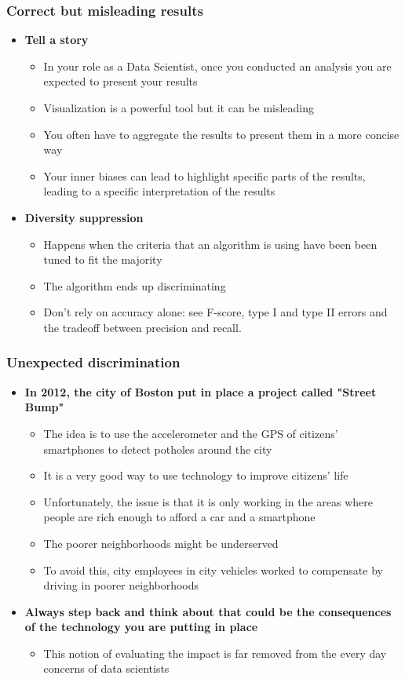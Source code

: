 \documentclass{beamer}
\begin{document}
\begin{frame}\frametitle{Correct but misleading results}
\begin{itemize}
	\setlength\itemsep{1em}
	\item {\bf Tell a story}
	\begin{itemize}
		\item In your role as a Data Scientist, once you conducted an analysis you are expected to present your results
		\item Visualization is a powerful tool but it can be misleading
		\item You often have to aggregate the results to present them in a more concise way
		\item Your inner biases can lead to highlight specific parts of the results, leading to a specific interpretation of the results
	\end{itemize}
	\item {\bf Diversity suppression}
	\begin{itemize}
		\item Happens when the criteria that an algorithm is using have been been tuned to fit the majority
		\item The algorithm ends up discriminating
		\item Don't rely on accuracy alone: see F-score, type I and type II errors and the tradeoff between precision and recall.
	\end{itemize}
\end{itemize}
\end{frame}

\begin{frame}\frametitle{Unexpected discrimination}
\begin{itemize}
	\setlength\itemsep{1em}
	\item {\bf In 2012, the city of Boston put in place a project called "Street Bump"}
	\begin{itemize}
		\item The idea is to use the accelerometer and the GPS of citizens' smartphones to detect potholes around the city
		\item It is a very good way to use technology to improve citizens' life
		\item Unfortunately, the issue is that it is only working in the areas where people are rich enough to afford a car and a smartphone
		\item The poorer neighborhoods might be underserved
		\item To avoid this, city employees in city vehicles worked to compensate by driving in poorer neighborhoods
	\end{itemize}
	\item {\bf Always step back and think about that could be the consequences of the technology you are putting in place}
	\begin{itemize}
		\item This notion of evaluating the impact is far removed from the every day concerns of data scientists
	\end{itemize}
\end{itemize}
\end{frame}
\end{document}
